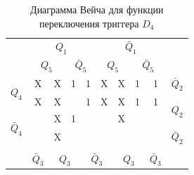 \documentclass[a4paper,14pt]{article}
\begin{document}
\begin{table}[H]
	\begin{center}
		\caption{\label{tab:D4_tab} Диаграмма Вейча для функции переключения триггера $D_4$ }
		\begin{tabular}{cccccccccc}
			& \multicolumn{4}{c}{$Q_1$} & \multicolumn{4}{c}{$\bar{Q}_1$} &  \\
			& \multicolumn{2}{c}{$Q_5$} & \multicolumn{2}{c}{$\bar{Q}_5$} & \multicolumn{2}{c}{$Q_5$} & \multicolumn{2}{c}{$\bar{Q}_5$} &  \\ \cline{2-9}
			\multicolumn{1}{c|}{\multirow{2}{*}{$Q_4$}} & \multicolumn{1}{c|}{X} & \multicolumn{1}{c|}{X} & \multicolumn{1}{c|}{1} & \multicolumn{1}{c|}{1} & \multicolumn{1}{c|}{X} & \multicolumn{1}{c|}{X} & \multicolumn{1}{c|}{1} & \multicolumn{1}{c|}{1} & $\bar{Q}_2$ \\ \cline{2-9}
			\multicolumn{1}{c|}{} & \multicolumn{1}{c|}{X} & \multicolumn{1}{c|}{X} & \multicolumn{1}{c|}{} & \multicolumn{1}{c|}{1} & \multicolumn{1}{c|}{X} & \multicolumn{1}{c|}{X} & \multicolumn{1}{c|}{1} & \multicolumn{1}{c|}{1} & \multirow{2}{*}{$Q_2$} \\ \cline{2-9}
			\multicolumn{1}{c|}{\multirow{2}{*}{$\bar{Q}_4$}} & \multicolumn{1}{c|}{} & \multicolumn{1}{c|}{X} & \multicolumn{1}{c|}{1} & \multicolumn{1}{c|}{} & \multicolumn{1}{c|}{} & \multicolumn{1}{c|}{X} & \multicolumn{1}{c|}{} & \multicolumn{1}{c|}{} &  \\ \cline{2-9}
			\multicolumn{1}{c|}{} & \multicolumn{1}{c|}{} & \multicolumn{1}{c|}{X} & \multicolumn{1}{c|}{} & \multicolumn{1}{c|}{} & \multicolumn{1}{c|}{} & \multicolumn{1}{c|}{} & \multicolumn{1}{c|}{} & \multicolumn{1}{c|}{} & $\bar{Q}_2$ \\ \cline{2-9}
			&  & \multicolumn{2}{c}{} & \multicolumn{2}{c}{} & \multicolumn{2}{c}{} &  &  \\
			& $\bar{Q}_3$ & \multicolumn{2}{c}{$Q_3$} & \multicolumn{2}{c}{$\bar{Q}_3$} & \multicolumn{2}{c}{$Q_3$} & $\bar{Q}_3$ & 
		\end{tabular}
	\end{center}
\end{table}

\end{document}
